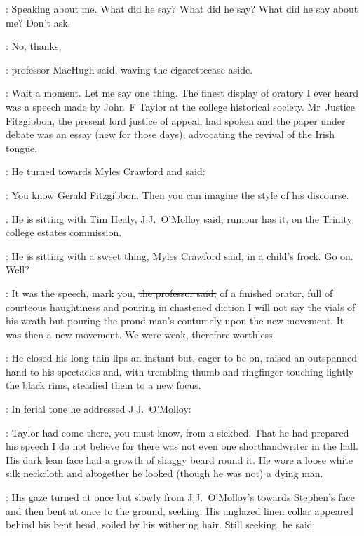 \StephenInt:
Speaking about me.
What did he say?
What did he say?
What did he say about me?
Don't ask.

\machugh:
No, thanks,

:
professor MacHugh said,
waving the cigarettecase aside.

\machugh:
Wait a moment.
Let me say one thing.
The finest display of oratory I ever heard
was a speech made by John~F Taylor at the college historical society.
Mr~Justice Fitzgibbon,
the present lord justice of appeal,
had spoken
and the paper under debate was an essay (new for those days),
advocating the revival of the Irish tongue.

:
He turned towards Myles Crawford and said:

\machugh:
You know Gerald Fitzgibbon.
Then you can imagine the style of his discourse.

\jjom:
He is sitting with Tim Healy,
\sout{J.J.~O'Molloy said,}
rumour has it,
on the Trinity college estates commission.

\crawford:
He is sitting with a sweet thing,
\sout{Myles Crawford said,}
in a child's frock.
Go on.
Well?

\machugh:
It was the speech,
mark you,
\sout{the professor said,}
of a finished orator,
full of courteous haughtiness and pouring in chastened diction
I will not say the vials of his wrath
but pouring the proud man's contumely upon the new movement.
It was then a new movement.
We were weak,
therefore worthless.

:
He closed his long thin lips an instant
but, eager to be on,
raised an outspanned hand to his spectacles
and, with trembling thumb and ringfinger touching lightly the black rims,
steadied them to a new focus.



:
In ferial tone
he addressed J.J.~O'Molloy:

\machugh:
Taylor had come there,
you must know,
from a sickbed.
That he had prepared his speech I do not believe
for there was not even one shorthandwriter in the hall.
His dark lean face had a growth of shaggy beard round it.
He wore a loose white silk neckcloth
and altogether he looked (though he was not)
a dying man.

:
His gaze turned at once but slowly from J.J.~O'Molloy's
towards Stephen's face
and then bent at once to the ground,
seeking.
His unglazed linen collar appeared behind his bent head,
soiled by his withering hair.
Still seeking,
he said:

